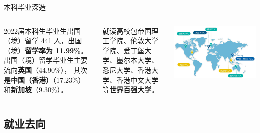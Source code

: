 \documentclass[aspectratio=169, utf8, fontset=windows]{beamer}
\begin{document}
\begin{frame}{本科毕业深造}
    \begin{columns}
        \setlength{\parindent}{2em}

        2022届本科生毕业生出国（境）留学 441 人，出国（境）\textcolor{Fore}{\textbf{留学率为 11.99\%}}。
        出国（境）留学毕业生主要流向\textcolor{Fore}{\textbf{英国}}（44.90\%），
        其次是\textcolor{Fore}{\textbf{中国（香港）}}（17.23\%）和\textcolor{Fore}{\textbf{新加坡}}（9.30\%）。

        就读高校包帝国理工学院、伦敦大学学院、爱丁堡大学、墨尔本大学、悉尼大学、香港大学、香港中文大学等\textcolor{Fore}{\textbf{世界百强大学}}。

        \includegraphics[width=\textwidth]{./resources/18.jpg}
    \end{columns}
\end{frame}

\subsection*{就业去向}
\end{document}
